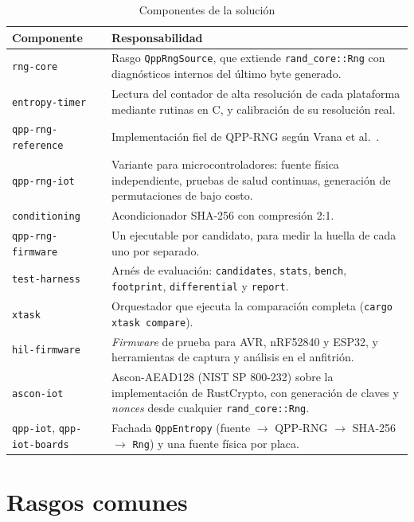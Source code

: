 \begin{table}[H]
\centering
\caption{Componentes de la solución}
\label{tab:crates}
\begin{tabularx}{\textwidth}{@{}L{0.30\textwidth}Y@{}}
\toprule
\textbf{Componente} & \textbf{Responsabilidad} \\
\midrule
\texttt{rng-core} & Rasgo \texttt{QppRngSource}, que extiende \texttt{rand\_core::Rng} con diagnósticos internos del último byte generado. \\
\texttt{entropy-timer} & Lectura del contador de alta resolución de cada plataforma mediante rutinas en C, y calibración de su resolución real. \\
\texttt{qpp-rng-reference} & Implementación fiel de QPP-RNG según Vrana et al.\ \cite{Vrana2025RawEvaluation}. \\
\texttt{qpp-rng-iot} & Variante para microcontroladores: fuente física independiente, pruebas de salud continuas, generación de permutaciones de bajo costo. \\
\texttt{conditioning} & Acondicionador SHA-256 con compresión 2:1. \\
\texttt{qpp-rng-firmware} & Un ejecutable por candidato, para medir la huella de cada uno por separado. \\
\texttt{test-harness} & Arnés de evaluación: \texttt{candidates}, \texttt{stats}, \texttt{bench}, \texttt{footprint}, \texttt{differential} y \texttt{report}. \\
\texttt{xtask} & Orquestador que ejecuta la comparación completa (\texttt{cargo xtask compare}). \\
\texttt{hil-firmware} & \textit{Firmware} de prueba para AVR, nRF52840 y ESP32, y herramientas de captura y análisis en el anfitrión. \\
\texttt{ascon-iot} & Ascon-AEAD128 (NIST SP 800-232) sobre la implementación de RustCrypto, con generación de claves y \textit{nonces} desde cualquier \texttt{rand\_core::Rng}. \\
\texttt{qpp-iot}, \texttt{qpp-iot-boards} & Fachada \texttt{QppEntropy} (fuente $\rightarrow$ QPP-RNG $\rightarrow$ SHA-256 $\rightarrow$ \texttt{Rng}) y una fuente física por placa. \\
\bottomrule
\end{tabularx}
\end{table}

\section{Rasgos comunes}

